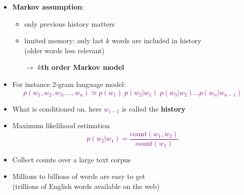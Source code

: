 \documentclass[landscape]{slides}
\newcommand{\maths}[1]{\textcolor{purple}{#1}}
\begin{document}

\vspace{10mm}
\begin{itemize}
\item {\bf Markov assumption}:
\begin{itemize}
\item only previous history matters
\item limited memory: only last $k$ words are included in history \\(older words less relevant)
\item[$\rightarrow$] {\bf $k$th order Markov model}
\end{itemize}
\item For instance 2-gram language model:
\maths{\begin{equation*}
p(w_1,w_2,w_3,...,w_n) \simeq p(w_1)\;p(w_2|w_1)\;p(w_3|w_2) ... p(w_n|w_{n-1})
\end{equation*}}\vspace{-17mm}
\item What is conditioned on, here \maths{$w_{i-1}$} is called the {\bf history}
\end{itemize}


\vspace{20mm}
\begin{itemize}
\item Maximum likelihood estimation
\maths{\begin{equation*}
p(w_2|w_1) = \frac{\text{count}(w_1,w_2)}{\text{count}(w_1)}
\end{equation*}}\vspace{-17mm}
\item Collect counts over a large text corpus
\item Millions to billions of words are easy to get\\[3mm]
(trillions of English words available on the web)
\end{itemize}

\end{document}
